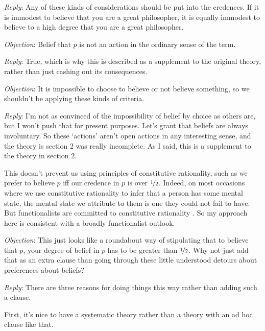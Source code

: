 \noindent \textit{Reply}: Any of these kinds of considerations should be put into the credences. If it is immodest to believe that you are a great philosopher, it is equally immodest to believe to a high degree that you are a great philosopher.

\medskip

\noindent \textit{Objection}: Belief that \(p\) is not an action in the ordinary sense of the term.

\noindent \textit{Reply}: True, which is why this is described as a supplement to the original theory, rather than just cashing out its consequences.

\medskip

\noindent \textit{Objection}: It is impossible to choose to believe or not believe something, so we shouldn't be applying these kinds of criteria.

\noindent \textit{Reply}: I'm not as convinced of the impossibility of belief by choice as others are, but I won't push that for present purposes. Let's grant that beliefs are always involuntary. So these `actions' aren't open actions in any interesting sense, and the theory is section 2 was really incomplete. As I said, this is a supplement to the theory in section 2.

This doesn't prevent us using principles of constitutive rationality, such as we prefer to believe \(p\) iff our credence in \(p\) is over \(\nicefrac{1}{2}\). Indeed, on most occasions where we use constitutive rationality to infer that a person has some mental state, the mental state we attribute to them is one they could not fail to have. But functionalists are committed to constitutive rationality \citep{Lewis1994b}. So my approach here is consistent with a broadly functionalist outlook.

\medskip

\noindent \textit{Objection}: This just looks like a roundabout way of stipulating that to believe that \(p\), your degree of belief in \(p\) has to be greater than \(\nicefrac{1}{2}\). Why not just add that as an extra clause than going through these little understood detours about preferences about beliefs?

\noindent \textit{Reply}: There are three reasons for doing things this way rather than adding such a clause. 

First, it's nice to have a systematic theory rather than a theory with an ad hoc clause like that. 

